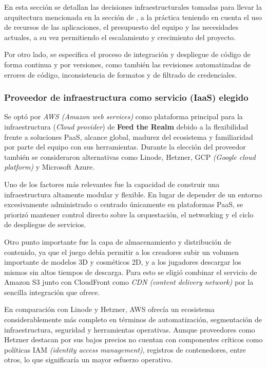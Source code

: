 En esta sección se detallan las decisiones infraestructurales tomadas para llevar la arquitectura mencionada en la sección de , 
a la práctica teniendo en cuenta el uso de recursos de las aplicaciones, el presupuesto del equipo y las necesidades actuales, 
a su vez permitiendo el escalamiento y crecimiento del proyecto.

Por otro lado, se especifica el proceso de integración y despliegue de código de forma continua y por versiones,
como también las revisiones automatizadas de errores de código, inconsistencia de formatos y de filtrado de credenciales.

\subsubsection{Proveedor de infraestructura como servicio (IaaS) elegido}

Se optó por \textit{AWS (Amazon web services)} como plataforma principal para la infraestructura (\textit{Cloud provider}) de \textbf{Feed the Realm}
debido a la flexibilidad frente a soluciones PaaS, alcance global, madurez del ecosistema y familiaridad por parte del equipo con sus herramientas.
Durante la elección del proveedor también se consideraron alternativas como Linode, Hetzner, 
GCP \textit{(Google cloud platform)} y Microsoft Azure.

Uno de los factores más relevantes fue la capacidad de construir una infraestructura altamente modular y flexible.
En lugar de depender de un entorno excesivamente administrado o centrado únicamente en plataformas PaaS,
se priorizó mantener control directo sobre la orquestación, el networking y el ciclo de despliegue de servicios.

Otro punto importante fue la capa de almacenamiento y distribución de contenido, ya que el juego debía permitir
a los creadores subir un volumen importante de modelos 3D y cosméticos 2D, y a los jugadores descargar los mismos sin
altos tiempos de descarga. Para esto se eligió combinar el servicio de Amazon S3 junto con CloudFront como 
\textit{CDN (content delivery network)} por la sencilla integración que ofrece.

En comparación con Linode y Hetzner, AWS ofrecía un ecosistema considerablemente más completo en términos de automatización,
segmentación de infraestructura, seguridad y herramientas operativas. Aunque proveedores como Hetzner destacan por sus bajos precios
no cuentan con componentes críticos como políticas IAM \textit{(identity access management)}, registros de contenedores, entre otros,
lo que significaría un mayor esfuerzo operativo.

